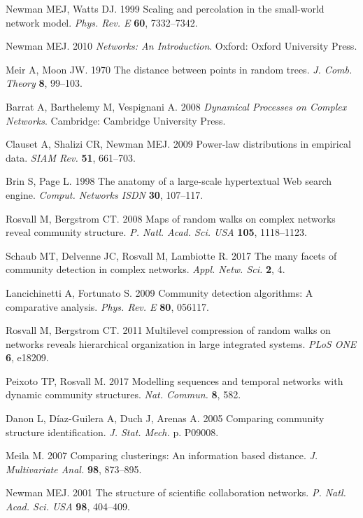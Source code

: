 \documentclass[]{rsif}
\begin{document}
\begin{thebibliography}{99}
Newman MEJ, Watts DJ. 1999  Scaling and percolation in the small-world network
  model. {\em Phys. Rev. E} \textbf{60}, 7332--7342.

Newman MEJ. 2010 {\em Networks: {An} {Introduction}}.
Oxford: Oxford University Press.

Meir A, Moon JW. 1970  The distance between points in random trees. {\em J.
  Comb. Theory} \textbf{8}, 99--103.

Barrat A, Barthelemy M, Vespignani A. 2008 {\em Dynamical {Processes} on
  {Complex} {Networks}}.
Cambridge: Cambridge University Press.

Clauset A, Shalizi CR, Newman MEJ. 2009  Power-law distributions in empirical
  data. {\em SIAM Rev.} \textbf{51}, 661--703.

Brin S, Page L. 1998  The anatomy of a large-scale hypertextual {Web} search
  engine. {\em Comput. Networks ISDN} \textbf{30}, 107--117.

Rosvall M, Bergstrom CT. 2008  Maps of random walks on complex networks reveal
  community structure. {\em P. Natl. Acad. Sci. USA} \textbf{105}, 1118--1123.

Schaub MT, Delvenne JC, Rosvall M, Lambiotte R. 2017  The many facets of
  community detection in complex networks. {\em Appl. Netw. Sci.} \textbf{2},
  4.

Lancichinetti A, Fortunato S. 2009  Community detection algorithms: {A}
  comparative analysis. {\em Phys. Rev. E} \textbf{80}, 056117.

Rosvall M, Bergstrom CT. 2011  Multilevel compression of random walks on
  networks reveals hierarchical organization in large integrated systems. {\em
  PLoS ONE} \textbf{6}, e18209.

Peixoto TP, Rosvall M. 2017  Modelling sequences and temporal networks with
  dynamic community structures. {\em Nat. Commun.} \textbf{8}, 582.

Danon L, D{\'i}az-Guilera A, Duch J, Arenas A. 2005  Comparing community
  structure identification. {\em J. Stat. Mech.} p. P09008.

Meila M. 2007  Comparing clusterings: {An} information based distance. {\em J.
  Multivariate Anal.} \textbf{98}, 873--895.

Newman MEJ. 2001  The structure of scientific collaboration networks. {\em P.
  Natl. Acad. Sci. USA} \textbf{98}, 404--409.


\end{thebibliography}
\end{document}
